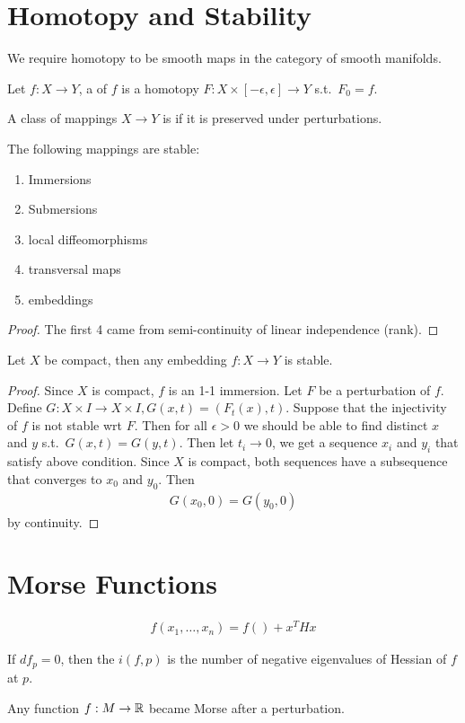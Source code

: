 \documentclass[12pt,class=article,crop=false]{standalone}
\begin{document}
\section{Homotopy and Stability}
We require homotopy to be smooth maps in the category of smooth manifolds.
\begin{defn}
	Let $ f: X \to Y$, a  of $ f$ is a homotopy  $ F: X \times [- \epsilon, \epsilon] \to Y$ s.t.\ $ F_0 = f$. 
\end{defn}

\begin{defn}
A class of mappings $ X \to Y$ is  if it is preserved under perturbations. 
\end{defn}

\begin{thm}
The following mappings are stable:
\begin{enumerate}[label=(\arabic*)]
	\item Immersions
	\item Submersions
	\item local diffeomorphisms
	\item transversal maps
	\item embeddings
\end{enumerate}
\end{thm}
\begin{proof}
The first 4 came from semi-continuity of linear independence (rank).
\end{proof}
\begin{thm}
Let $ X$ be compact, then any embedding $f: X \to Y$ is stable.
\end{thm}
\begin{proof}
Since $ X$ is compact,  $ f$ is an 1-1 immersion. Let  $ F$ be a perturbation of  $ f$. Define  $ G: X \times I \to X \times I, G(x,t) = (F_t(x),t)$. Suppose that the injectivity of $ f$ is not stable wrt  $ F$. Then for all $ \epsilon>0$ we should be able to find distinct $ x$ and  $ y$ s.t.\ $ G(x,t) = G(y,t)$. Then let $ t_i \to 0$, we get a sequence $ x_i$ and $ y_i$ that satisfy above condition. Since $ X$ is compact, both sequences have a subsequence that converges to  $ x_0$  and  $ y_0$. Then
 \begin{align*}
	G(x_0,0) = G(y_0,0)
\end{align*}
by continuity.
\end{proof}

\section{Morse Functions}
\begin{lem}[Morse]
\begin{align*}
	f(x_1,\ldots,x_n) = f() + x^{T} H x
\end{align*}
\end{lem}
\begin{defn}
If $ df_p = 0$, then the  $ i(f,p) $ is the number of negative eigenvalues of Hessian of  $ f$ at  $ p$. 
\end{defn}
\begin{remark}
Any function $ f: M \to \mathbb{R}$ became Morse after a perturbation.
\end{remark}
\end{document}
